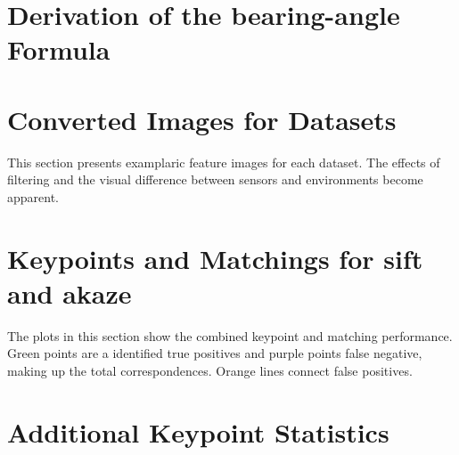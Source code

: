 \documentclass[numbers=noenddot,doktyp=marbeit,fontsize=12pt,sprache=english,hausschrift=true,draft=false]{TUBAFarbeiten}
\begin{document}
\begin{appendix}
    \renewcommand*{\thepage}{\thesection\arabic{page}}
    \renewcommand{\thetable}{\thesection\arabic{table}}
    \renewcommand{\thefigure}{\thesection\arabic{figure}}

    \newpage

    \section{Derivation of the \Gls{bearing-angle} Formula}\label{sec:bearing_derivation}
    
    \newpage

    \section{Converted Images for Datasets}

    This section presents examplaric feature images for each dataset.
    The effects of filtering and the visual difference between sensors and environments become apparent.
    {\setlength{\abovecaptionskip}{-20pt}%
     \setlength{\belowcaptionskip}{-30pt}%
     \setlength{\floatsep}{1pt plus 1pt minus 1pt}%
     \setlength{\textfloatsep}{1pt plus 1.0pt minus 2.0pt}
     \setlength{\intextsep}{1pt plus 1.0pt minus 2.0pt}
    
    
    
    
    
    }
    \newpage

    \section{Keypoints and Matchings for \acrshort{sift} and \acrshort{akaze}}
    The plots in this section show the combined keypoint and matching performance.
    Green points are a identified true positives and purple points false negative, making up the total correspondences.
    Orange lines connect false positives.
    
    
    \newpage

    \section{Additional Keypoint Statistics}
    
    
    
    
    \newpage
\end{appendix}



\end{document}
